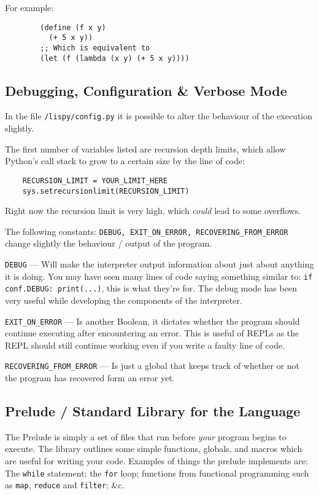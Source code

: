 \documentclass{article}
\newcommand{\code}[1]{\texttt{#1}}
\newcommand{\etc}{{\&}c.}
\begin{document}
    For example:
      \begin{verbatim}
        (define (f x y)
          (+ 5 x y))
        ;; Which is equivalent to
        (let (f (lambda (x y) (+ 5 x y))))
      \end{verbatim}

    \clearpage

  \subsection{Debugging, Configuration \& Verbose Mode}
    In the file \code{/lispy/config.py} it is possible to alter
    the behaviour of the execution slightly.

    The first number of variables listed are recursion depth limits,
    which allow Python's call stack to grow to a certain size by
    the line of code:

    \begin{verbatim}
    RECURSION_LIMIT = YOUR_LIMIT_HERE
    sys.setrecursionlimit(RECURSION_LIMIT)
    \end{verbatim}

    Right now the recursion limit is very high, which \emph{could} lead
    to some overflows.

    The following constants: \code{DEBUG, EXIT\_ON\_ERROR, RECOVERING\_FROM\_ERROR}
    change slightly the behaviour / output of the program.

    \code{DEBUG} --- Will make the interpreter output information about
    just about anything it is doing. You may have seen many lines of code
    saying something similar to: \code{if conf.DEBUG: print(...)},
    this is what they're for. The debug mode has been very useful while
    developing the components of the interpreter.

    \code{EXIT\_ON\_ERROR} --- Is another Boolean, it dictates whether the
    program should continue executing after encountering an error.
    This is useful of REPLs as the REPL should still continue working
    even if  you write a faulty line of code.

    \code{RECOVERING\_FROM\_ERROR} --- Is just a global that keeps
    track of whether or not the program has recovered form an error yet.

  \subsection{Prelude / Standard Library for the Language}
    The Prelude is simply a set of files that run before \emph{your} program
    begins to execute. The library outlines some simple functions, globals, and
    macros which are useful for writing your code. Examples of things the prelude
    implements are: The \code{while} statement; the \code{for} loop; functions
    from functional programming such as \code{map}, \code{reduce} and \code{filter};
    \etc
\end{document}
